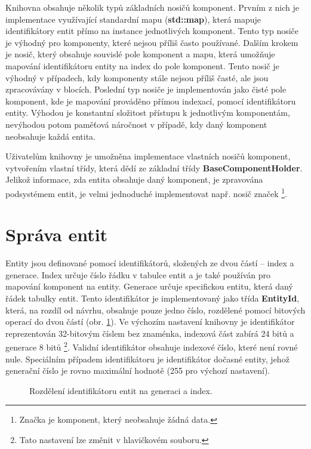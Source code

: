 Knihovna obsahuje několik typů základních nosičů komponent. Prvním z nich je implementace využívající standardní mapu (\textbf{std::map}), která mapuje identifikátory entit přímo na instance jednotlivých komponent. Tento typ nosiče je výhodný pro komponenty, které nejsou příliš často používané. Dalším krokem je nosič, který obsahuje souvislé pole komponent a mapu, která umožňuje mapování identifikátoru entity na index do pole komponent. Tento nosič je výhodný v případech, kdy komponenty stále nejsou příliš časté, ale jsou zpracovávány v blocích. Poslední typ nosiče je implementován jako čisté pole komponent, kde je mapování prováděno přímou indexací, pomocí identifikátoru entity. Výhodou je konstantní složitost přístupu k jednotlivým komponentám, nevýhodou potom paměťová náročnost v případě, kdy daný komponent neobsahuje každá entita. 

Uživatelům knihovny je umožněna implementace vlastních nosičů komponent, vytvořením vlastní třídy, která dědí ze základní třídy \textbf{BaseComponentHolder}. Jelikož informace, zda entita obsahuje daný komponent, je zpravována podsystémem entit, je velmi jednoduché implementovat např. nosič značek \footnote{Značka je komponent, který neobsahuje žádná data.}. 

\section{Správa entit}

Entity jsou definované pomocí identifikátorů, složených ze dvou částí -- index a generace. Index určuje číslo řádku v tabulce entit a je také používán pro mapování komponent na entity. Generace určuje specifickou entitu, která  daný řádek tabulky entit. Tento identifikátor je implementovaný jako třída \textbf{EntityId}, která, na rozdíl od návrhu, obsahuje pouze jedno číslo, rozdělené pomocí bitových operací do dvou částí (obr. \ref{Fig:IMPLIdent}). Ve výchozím nastavení knihovny je identifikátor reprezentován 32-bitovým číslem bez znaménka, indexová část zabírá 24 bitů a generace 8 bitů \footnote{Tato nastavení lze změnit v hlavičkovém souboru.}. Validní identifikátor obsahuje indexové číslo, které není rovné nule. Speciálním případem identifikátoru je identifikátor dočasné entity, jehož generační číslo je rovno maximální hodnotě (255 pro výchozí nastavení).

\begin{figure}[H]
	\begin{center}
	\end{center}
	\caption{Rozdělení identifikátoru entit na generaci a index.}
	\label{Fig:IMPLIdent}
\end{figure}

